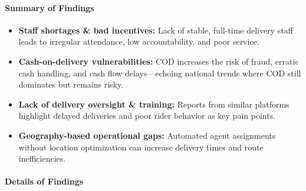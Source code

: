 \documentclass[12pt,a4paper]{article}
\begin{document}
\paragraph{Summary of Findings}

\begin{itemize}
    \item \textbf{Staff shortages \& bad incentives:} Lack of stable, full-time delivery staff leads to irregular attendance, low accountability, and poor service.
    \item \textbf{Cash-on-delivery vulnerabilities:} COD increases the risk of fraud, erratic cash handling, and cash flow delays—echoing national trends where COD still dominates but remains risky.
    \item \textbf{Lack of delivery oversight \& training:} Reports from similar platforms highlight delayed deliveries and poor rider behavior as key pain points.
    \item \textbf{Geography-based operational gaps:} Automated agent assignments without location optimization can increase delivery times and route inefficiencies.
\end{itemize}

\paragraph{Details of Findings}
\end{document}
